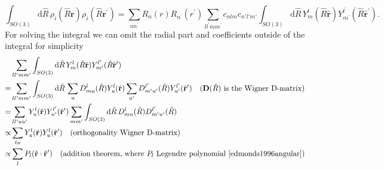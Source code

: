 \begin{equation}
  \int_{SO(3)}\mathrm{d}\hat{R}\, \rho_i(\hat{R}\mathbf{r})\rho_i(\hat{R}\mathbf{r}^\prime) = \sum_{nn^\prime} R_n(r)R_{n^\prime}(r^\prime) \sum_{ll^\prime mm^\prime}c_{nlm}c_{n'l'm'}\int_{SO(3)}\mathrm{d}\hat{R}\, Y^{l}_m(\hat{R}\hat{\mathbf{r}})Y^{l^\prime}_{m^\prime}(\hat{R}\hat{\mathbf{r}}^\prime).
\end{equation}
For solving the integral we can omit the radial part and coefficients outside of the integral for simplicity
\begin{subequations}
  \label{eq:solving_haar_integral}
\begin{align}
   & \sum_{ll^\prime mm^\prime}\int_{SO(3)}\mathrm{d}\hat{R}\, Y^{l}_m(\hat{R}\hat{\mathbf{r}})Y^{l^\prime}_{m^\prime}(\hat{R}\hat{\mathbf{r}}^\prime)\\
  =& \sum_{ll^\prime mm^\prime} \int_{SO(3)} \mathrm{d}\hat{R}\, \sum_{u} D_{mu}^l(\hat{R})Y^l_u(\hat{\mathbf{r}})\sum_{u^\prime}D_{m^\prime u^\prime}^{l^\prime}(\hat{R})Y^{l^\prime}_{u^\prime}(\hat{\mathbf{r}}^\prime) \quad \textrm{($\mathbf{D}(\hat{R})$ is the Wigner D-matrix)}\\
  =& \sum_{ll^\prime uu^\prime} Y^l_u(\hat{\mathbf{r}})Y^{l^\prime}_{u^\prime}(\hat{\mathbf{r}}^\prime)\sum_{mm^\prime}\int_{SO(3)} \mathrm{d}\hat{R}\, D_{m u}^l(\hat{R})D_{m^\prime u^\prime}^{l^\prime}(\hat{R})\\
  \propto& \sum_{l u} Y^l_u(\hat{\mathbf{r}})Y^l_{u}(\hat{\mathbf{r}}^\prime)\quad \textrm{(orthogonality Wigner D-matrix)}\\
  \propto& \sum_{l} P_l(\hat{\mathbf{r}}\cdot\hat{\mathbf{r}}^\prime) \quad \textrm{(addition theorem, where $P_l$ Legendre polynomial~\cite{edmonds1996angular})}
\end{align}
\end{subequations}
